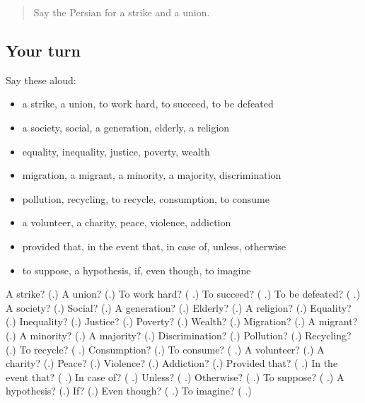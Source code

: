 \begin{quote}
Say the Persian for a strike and a union.
\end{quote}

\subsection*{Your turn}
Say these aloud:

\begin{itemize}
\raggedright
  \item a strike, a union, to work hard, to succeed, to be defeated
  \item a society, social, a generation, elderly, a religion
  \item equality, inequality, justice, poverty, wealth
  \item migration, a migrant, a minority, a majority, discrimination
  \item pollution, recycling, to recycle, consumption, to consume
  \item a volunteer, a charity, peace, violence, addiction
  \item provided that, in the event that, in case of, unless, otherwise
  \item to suppose, a hypothesis, if, even though, to imagine
\end{itemize}

\begin{tcolorbox}[breakable,colback=teal!4,colframe=teal!35!black,title={Before you move on}]
A strike? (\textbf{}.) A union? (\textbf{}.) To work hard? (\textbf{ }.) To succeed? (\textbf{ }.) To be defeated? (\textbf{ }.) A society? (\textbf{}.) Social? (\textbf{}.) A generation? (\textbf{}.) Elderly? (\textbf{}.) A religion? (\textbf{}.) Equality? (\textbf{}.) Inequality? (\textbf{}.) Justice? (\textbf{}.) Poverty? (\textbf{}.) Wealth? (\textbf{}.) Migration? (\textbf{}.) A migrant? (\textbf{}.) A minority? (\textbf{}.) A majority? (\textbf{}.) Discrimination? (\textbf{}.) Pollution? (\textbf{}.) Recycling? (\textbf{}.) To recycle? (\textbf{ }.) Consumption? (\textbf{}.) To consume? (\textbf{ }.) A volunteer? (\textbf{}.) A charity? (\textbf{}.) Peace? (\textbf{}.) Violence? (\textbf{}.) Addiction? (\textbf{}.) Provided that? (\textbf{  }.) In the event that? (\textbf{  }.) In case of? (\textbf{ }.) Unless? (\textbf{ }.) Otherwise? (\textbf{   }.) To suppose? (\textbf{ }.) A hypothesis? (\textbf{}.) If? (\textbf{}.) Even though? (\textbf{  }.) To imagine? (\textbf{ }.)
\end{tcolorbox}
